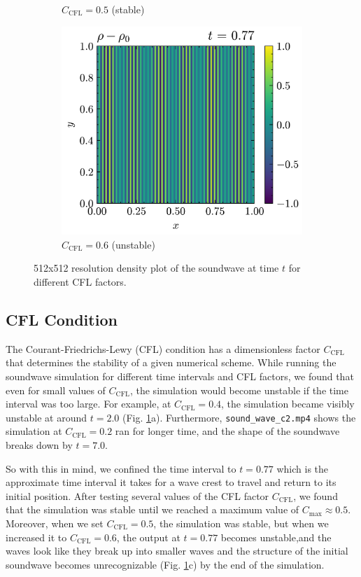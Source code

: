 \documentclass{article}
\begin{document}
\begin{figure}[htbp]
\begin{subfigure}{0.31\textwidth}
        \caption{$C_{\text{CFL}} = 0.5$ (stable)}
    \end{subfigure}
    \hfill
    \begin{subfigure}{0.31\textwidth}
        \centering
        \includegraphics[width=\textwidth]{sound_wave/cmax_output_rho_77_unstable.png}
        \caption{$C_{\text{CFL}} = 0.6$ (unstable)}
    \end{subfigure}
    \caption{512x512 resolution density plot of the soundwave at time $t$ for different CFL factors.}
    \label{fig:soundwave}
\end{figure}

\subsection*{CFL Condition}
The Courant-Friedrichs-Lewy (CFL) condition has a dimensionless factor $C_{\text{CFL}}$ that determines the stability of a given
numerical scheme. While running the soundwave simulation for different time intervals and CFL factors, we found that
even for small values of $C_{\text{CFL}}$, the simulation would become unstable if the time interval was too large. For example,
at $C_\text{CFL} = 0.4$, the simulation became visibly unstable at around $t = 2.0$ (Fig. \ref{fig:soundwave}a).
Furthermore, \texttt{sound\_wave\_c2.mp4} shows the simulation at $C_{\text{CFL}} = 0.2$ ran for longer time, and the shape of the soundwave
breaks down by $t = 7.0$.

So with this in mind, we confined the time interval to $t=0.77$ which is the approximate time interval it takes for a wave crest to
travel and return to its initial position.
After testing several values of the CFL factor $C_{\text{CFL}}$,
we found that the simulation was stable until we reached a maximum value of $C_\text{max} \approx 0.5$.
Moreover, when we set $C_{\text{CFL}} = 0.5$, the simulation was stable, but when we increased it to $C_{\text{CFL}} = 0.6$,
the output at $t=0.77$ becomes unstable,and the waves look like they break up into smaller waves and the structure of the initial soundwave becomes 
unrecognizable (Fig. \ref{fig:soundwave}c) by the end of the simulation.
\end{document}
